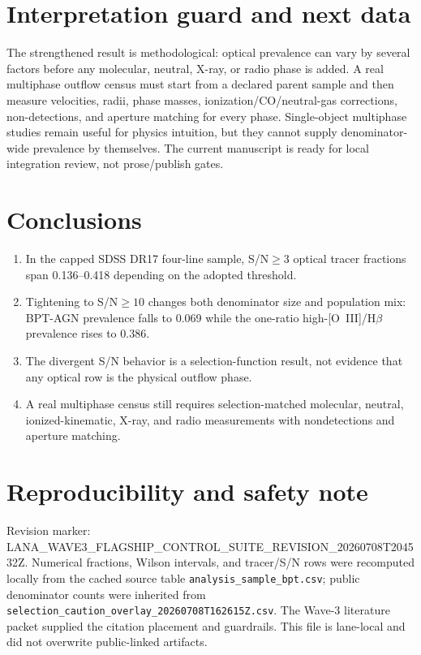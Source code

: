 \documentclass[twocolumn]{aastex631}
\begin{document}
\section{Interpretation guard and next data}
The strengthened result is methodological: optical prevalence can vary by several factors before any molecular, neutral, X-ray, or radio phase is added.  A real multiphase outflow census must start from a declared parent sample and then measure velocities, radii, phase masses, ionization/CO/neutral-gas corrections, non-detections, and aperture matching for every phase.  Single-object multiphase studies remain useful for physics intuition, but they cannot supply denominator-wide prevalence by themselves.  The current manuscript is ready for local integration review, not prose/publish gates.


\section{Conclusions}\label{sec:m3p1_conclusions}
\begin{enumerate}
\item In the capped SDSS DR17 four-line sample, S/N$\geq3$ optical tracer fractions span 0.136--0.418 depending on the adopted threshold.
\item Tightening to S/N$\geq10$ changes both denominator size and population mix: BPT-AGN prevalence falls to 0.069 while the one-ratio high-[O~III]/H$\beta$ prevalence rises to 0.386.
\item The divergent S/N behavior is a selection-function result, not evidence that any optical row is the physical outflow phase.
\item A real multiphase census still requires selection-matched molecular, neutral, ionized-kinematic, X-ray, and radio measurements with nondetections and aperture matching.
\end{enumerate}

\section*{Reproducibility and safety note}
Revision marker: LANA\_WAVE3\_FLAGSHIP\_CONTROL\_SUITE\_REVISION\_20260708T204532Z.  Numerical fractions, Wilson intervals, and tracer/S/N rows were recomputed locally from the cached source table \texttt{analysis\_sample\_bpt.csv}; public denominator counts were inherited from \texttt{selection\_caution\_overlay\_20260708T162615Z.csv}.  The Wave-3 literature packet supplied the citation placement and guardrails.  This file is lane-local and did not overwrite public-linked artifacts.
\end{document}
